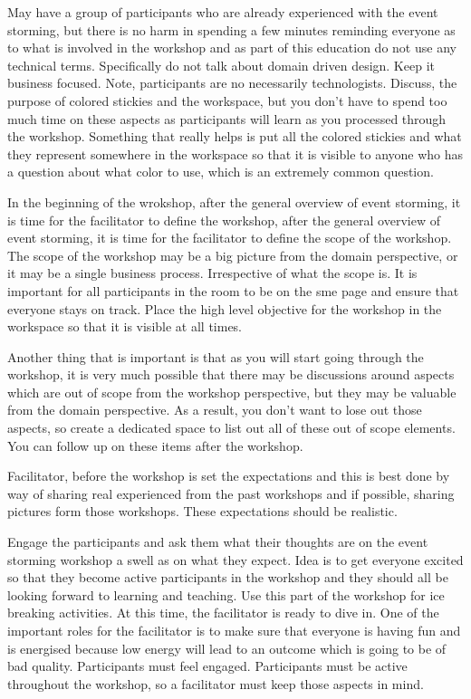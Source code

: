 \documentclass[a4paper, 11pt]{book}
\begin{document}
    May have a group of participants who are already experienced with the event storming, but there is no harm in spending a few minutes reminding everyone as to what is involved in the workshop and as part of this education do not use any technical terms.
    Specifically do not talk about domain driven design.
    Keep it business focused.
    Note, participants are no necessarily technologists.
    Discuss, the purpose of colored stickies and the workspace, but you don't have to spend too much time on these aspects as participants will learn as you processed through the workshop.
    Something that really helps is put all the colored stickies and what they represent somewhere in the workspace so that it is visible to anyone who has a question about what color to use, which is an extremely common question.

    In the beginning of the wrokshop, after the general overview of event storming, it is time for the facilitator to define the workshop, after the general overview of event storming, it is time for the facilitator to define the scope of the workshop.
    The scope of the workshop may be a big picture from the domain perspective, or it may be a single business process.
    Irrespective of what the scope is.
    It is important for all participants in the room to be on the sme page and ensure that everyone stays on track.
    Place the high level objective for the workshop in the workspace so that it is visible at all times.

    Another thing that is important is that as you will start going through the workshop, it is very much possible that there may be discussions around aspects which are out of scope from the workshop perspective, but they may be valuable from the domain perspective.
    As a result, you don't want to lose out those aspects, so create a dedicated space to list out all of these out of scope elements.
    You can follow up on these items after the workshop.

    Facilitator, before the workshop is set the expectations and this is best done by way of sharing real experienced from the past workshops and if possible, sharing pictures form those workshops.
    These expectations should be realistic.

    Engage the participants and ask them what their thoughts are on the event storming workshop a swell as on what they expect.
    Idea is to get everyone excited so that they become active participants in the workshop and they should all be looking forward to learning and teaching.
    Use this part of the workshop for ice breaking activities.
    At this time, the facilitator is ready to dive in.
    One of the important roles for the facilitator is to make sure that everyone is having fun and is energised because low energy will lead to an outcome which is going to be of bad quality.
    Participants must feel engaged.
    Participants must be active throughout the workshop, so a facilitator must keep those aspects in mind.
\end{document}
